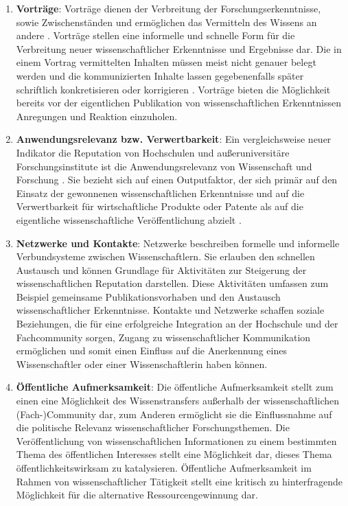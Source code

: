\begin{enumerate}
\item \textbf{Vorträge}: Vorträge dienen der Verbreitung der Forschungserkenntnisse, sowie Zwischenständen und ermöglichen das Vermitteln des Wissens an andere \cite{rassenhoevel_2010_performancemessung}. Vorträge stellen eine informelle und schnelle Form für die Verbreitung neuer wissenschaftlicher Erkenntnisse und Ergebnisse dar. Die in einem Vortrag vermittelten Inhalten müssen meist nicht genauer belegt werden und die kommunizierten Inhalte lassen gegebenenfalls später schriftlich konkretisieren oder korrigieren \cite{haberle_2002_jahrbuch}. Vorträge bieten die Möglichkeit bereits vor der eigentlichen Publikation von wissenschaftlichen Erkenntnissen Anregungen und Reaktion einzuholen.
\item\textbf{Anwendungsrelevanz bzw. Verwertbarkeit}: Ein vergleichsweise neuer Indikator die Reputation von Hochschulen und außeruniversitäre Forschungsinstitute ist die Anwendungsrelevanz von Wissenschaft und Forschung \cite{simon_2009_wissenschaft_governance}. Sie bezieht sich auf einen Outputfaktor, der sich primär auf den Einsatz der gewonnenen wissenschaftlichen Erkenntnisse und auf die Verwertbarkeit für wirtschaftliche Produkte oder Patente als auf die eigentliche wissenschaftliche Veröffentlichung abzielt \cite{suchen}.
\item \textbf{Netzwerke und Kontakte}: Netzwerke beschreiben formelle und informelle Verbundsysteme zwischen Wissenschaftlern. Sie erlauben den schnellen Austausch und können Grundlage für Aktivitäten zur Steigerung der wissenschaftlichen Reputation darstellen. Diese Aktivitäten umfassen zum Beispiel gemeinsame Publikationsvorhaben und den Austausch wissenschaftlicher Erkenntnisse. Kontakte und Netzwerke schaffen soziale Beziehungen, die für eine erfolgreiche Integration an der Hochschule und der Fachcommunity sorgen, Zugang zu wissenschaftlicher Kommunikation ermöglichen und somit einen Einfluss auf die Anerkennung eines Wissenschaftler oder einer Wissenschaftlerin haben können.
\item \textbf{Öffentliche Aufmerksamkeit}: Die öffentliche Aufmerksamkeit stellt zum einen eine Möglichkeit des Wissenstransfers außerhalb der wissenschaftlichen (Fach-)Community dar, zum Anderen ermöglicht sie die Einflussnahme auf die politische Relevanz wissenschaftlicher Forschungsthemen. Die Veröffentlichung von wissenschaftlichen Informationen zu einem bestimmten Thema des öffentlichen Interesses stellt eine Möglichkeit dar, dieses Thema öffentlichkeitswirksam zu katalysieren. Öffentliche Aufmerksamkeit im Rahmen von wissenschaftlicher Tätigkeit stellt eine kritisch zu hinterfragende Möglichkeit für die alternative Ressourcengewinnung dar. \cite{suche}

\end{enumerate}
